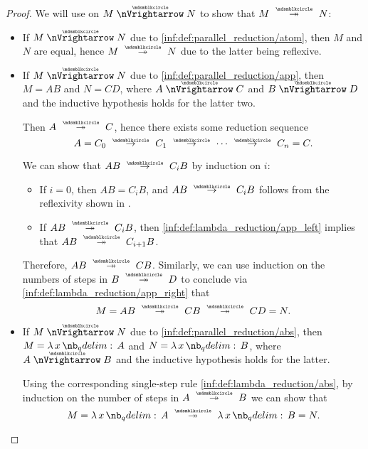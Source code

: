 \begin{proof}
   We will use  on \( M \ppred N \) to show that \( M \pred* N \):
  \begin{itemize}
    \item If \( M \ppred N \) due to \ref{inf:def:parallel_reduction/atom}, then \( M \) and \( N \) are equal, hence \( M \pred* N \) due to the latter being reflexive.

    \item If \( M \ppred N \) due to \ref{inf:def:parallel_reduction/app}, then \( M = AB \) and \( N = CD \), where \( A \ppred C \) and \( B \ppred D \) and the inductive hypothesis holds for the latter two.

    Then \( A \pred* C \), hence there exists some reduction sequence
    \begin{equation*}
      A = C_0 \pred C_1 \pred \cdots \pred C_n = C.
    \end{equation*}

    We can show that \( AB \pred C_i B \) by induction on \( i \):
    \begin{itemize}
      \item If \( i = 0 \), then \( AB = C_i B \), and \( AB \pred C_i B \) follows from the reflexivity shown in .

      \item If \( AB \pred* C_i B \), then \ref{inf:def:lambda_reduction/app_left} implies that \( AB \pred* C_{i+1} B \).
    \end{itemize}

    Therefore, \( AB \pred* CB \). Similarly, we can use induction on the numbers of steps in \( B \pred* D \) to conclude via \ref{inf:def:lambda_reduction/app_right} that
    \begin{equation*}
      M = AB \pred* CB \pred* CD = N.
    \end{equation*}

    \item If \( M \ppred N \) due to \ref{inf:def:parallel_reduction/abs}, then \( M = \qabs x A \) and \( N = \qabs x B \), where \( A \ppred B \) and the inductive hypothesis holds for the latter.

    Using the corresponding single-step rule \ref{inf:def:lambda_reduction/abs}, by induction on the number of steps in \( A \pred* B \) we can show that
    \begin{equation*}
      M = \qabs x A \pred* \qabs x B = N.
    \end{equation*}


\end{itemize}
\end{proof}
